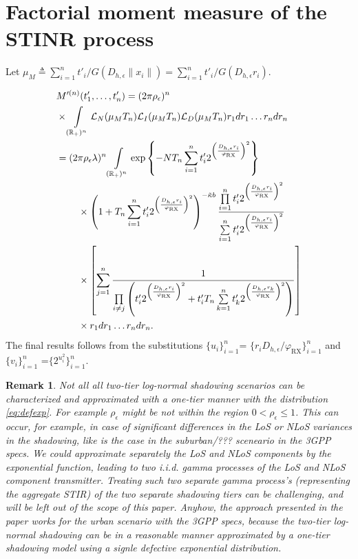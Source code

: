 \documentclass[lettersize,journal]{IEEEtran}
\newcommand{\R}{\mathbb{R}}
\newtheorem*{remark}{Remark}
\begin{document}
\section{Factorial moment measure of the STINR process}
Let $\mu_M \triangleq \sum_{i=1}^nt'_i/G(D_{h,\epsilon}\|x_i\|)=\sum_{i=1}^nt'_i/G(D_{h,\epsilon} r_i)$.

\begin{align}
  &M'^{(n)}(t'_1,\dots,t'_n) =(2 \pi \rho_{\epsilon})^n\nonumber\\
  & \times\int\limits_{(\R_+)^n} \mathcal{L}_N(\mu_MT_n)\mathcal{L}_I(\mu_MT_n)\mathcal{L}_D(\mu_MT_n) r_1 dr_1 \dots r_n dr_n\nonumber \\
  &=(2 \pi \rho_{\epsilon} \lambda)^n \int\limits_{(\R_+)^n} \exp\left\{-NT_n\sum\limits_{i=1}^nt'_i2^{\left(\frac{D_{h,\epsilon}r_i}{\varphi_{\text{RX}}}\right)^2}\right\} \nonumber\\
  &\hspace{0.8cm}\times\left(1+T_n\sum\limits_{i=1}^nt'_i2^{\left(\frac{D_{h,\epsilon}r_i}{\varphi_{\text{RX}}}\right)^2}\right)^{- \tilde{\kappa}b} \frac{\prod\limits_{i=1}^nt'_i2^{\left(\frac{D_{h,\epsilon}r_i}{\varphi_{\text{RX}}}\right)^2}}{\sum\limits_{i=1}^nt'_i2^{\left(\frac{D_{h,\epsilon}r_i}{\varphi_{\text{RX}}}\right)^2}} \nonumber\\
  &\hspace{0.8cm}\times  \left[\sum\limits_{j=1}^n\frac{1}{\prod\limits_{i\neq j}\left(t'_i 2^{\left(\frac{D_{h,\epsilon}r_i}{\varphi_{\text{RX}}}\right)^2}+ t_i'T_n\sum\limits_{k=1}^nt'_k2^{\left(\frac{D_{h,\epsilon}r_k}{\varphi_{\text{RX}}}\right)^2} \right)} \right] \nonumber\\
  &\hspace{0.8cm}\times r_1 dr_1 \dots r_n dr_n.
\end{align}
The final results follows from the substitutions $\{u_i\}_{i= 1}^n$= $\{r_i D_{h,\epsilon}/\varphi_{\text{RX}}\}_{i= 1}^n$ and $\{v_i\}_{i= 1}^n$ =$\{ 2^{u^2_i}\}_{i= 1}^n$.





\begin{remark}
  Not all all two-tier log-normal shadowing scenarios can be characterized and approximated with a one-tier manner with the distribution \eqref{eq:defexp}. For example $\rho_{\epsilon}$ might be not within the region $0<\rho_{\epsilon} \leq 1$. This can occur, for example, in case of significant differences in the LoS or NLoS variances in the shadowing, like is the case in the suburban/??? sceneario in the 3GPP specs. We could approximate separately the LoS and NLoS components by the exponential function, leading to two i.i.d. gamma processes of the LoS and NLoS component transmitter. Treating such two separate gamma process's (representing the aggregate STIR) of the two separate shadowing tiers can be challenging, and will be left out of the scope of this paper. Anyhow, the approach presented in the paper works for the urban scenario with the 3GPP specs, because the two-tier log-normal shadowing can be in a reasonable manner approximated by a one-tier shadowing model using a signle defective exponential distribution.
\end{remark}



%

\end{document}
